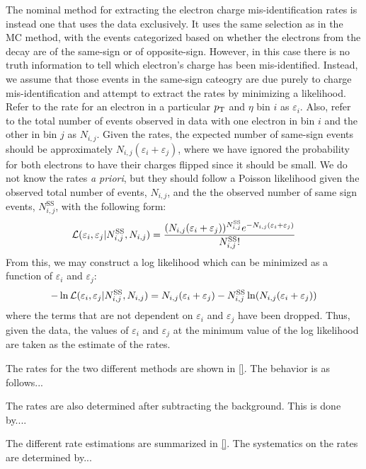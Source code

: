 The nominal method for extracting the electron charge mis-identification
rates is instead one that uses the data exclusively. 
It uses the same selection as in the MC method, with the events
categorized based on whether the electrons from the \z
decay are of the same-sign or of opposite-sign.
However, in this case
there is no truth information to tell which electron's charge
has been mis-identified. Instead, we assume that those events in
the same-sign cateogry are due purely to charge mis-identification
and attempt to extract the rates by minimizing a likelihood.
Refer to the rate for an electron in a 
particular $p_{\mathrm{T}}$ and $\eta$ bin $i$ as $\varepsilon_i$.
Also, refer to the total number of events observed in data with one electron
in bin $i$ and the other in bin $j$ as $N_{i,j}$.
Given the rates, the expected number of same-sign events
should be approximately $N_{i,j}(\varepsilon_i + \varepsilon_j)$,
where we have ignored the probability for both electrons to have their
charges flipped since it should be small. We do
not know the rates \emph{a priori}, but they should follow 
a Poisson likelihood given the observed total number of events,
$N_{i,j}$, and the the observed number of same sign events,
$N_{i,j}^{\textrm{SS}}$, with the following form:
\begin{equation}
\mathcal{L}( \varepsilon_i,\varepsilon_j | N_{i,j}^{\textrm{SS}},N_{i,j})
=
\frac{(N_{i,j}(\varepsilon_i+\varepsilon_j))^{N^{\textrm{SS}}_{i,j}} e^{-N_{i,j}(\varepsilon_i+\varepsilon_j)}}{N^{\textrm{SS}}_{i,j}!}
\end{equation}
From this, we may construct a log likelihood which can be minimized
as a function of $\varepsilon_i$ and $\varepsilon_j$:
\begin{equation}
-\ln \mathcal{L}( \varepsilon_i,\varepsilon_j | N_{i,j}^{\textrm{SS}},N_{i,j}) = 
N_{i,j}(\varepsilon_i+\varepsilon_j)
- N^{\textrm{SS}}_{i,j} \ln(N_{i,j}(\varepsilon_i+\varepsilon_j))
\end{equation}
where the terms that are not dependent on $\varepsilon_i$
and $\varepsilon_j$ have been dropped.
Thus, given the data, the values of $\varepsilon_i$ and $\varepsilon_j$
at the minimum value of the log likelihood are taken as the estimate
of the rates.

The rates for the two different methods are shown in \fig\ref{}.
The behavior is as follows... 


The rates are also determined after subtracting the background. 
This is done by....

The different rate estimations are summarized in \fig\ref{}.
The systematics on the rates are determined by...

